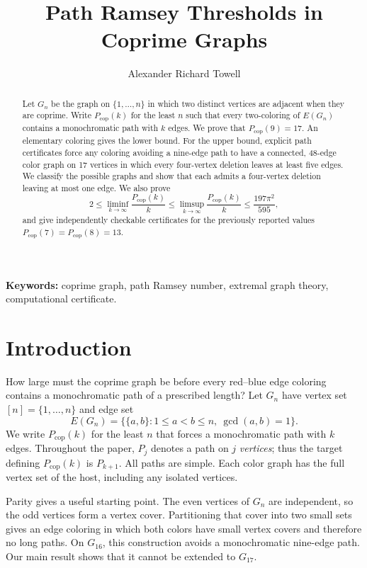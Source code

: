 \documentclass[12pt]{article}
\title{Path Ramsey Thresholds in Coprime Graphs}
\author{Alexander Richard Towell\authornote{1}}
\newcommand{\Pcop}{P_{\mathrm{cop}}}
\begin{document}
\maketitle

\begin{abstract}
Let $G_n$ be the graph on $\{1,\ldots,n\}$ in which two distinct
vertices are adjacent when they are coprime. Write $\Pcop(k)$ for
the least $n$ such that every two-coloring of $E(G_n)$ contains a
monochromatic path with $k$ edges. We prove that $\Pcop(9)=17$.
An elementary coloring gives the lower bound. For the upper bound,
explicit path certificates force any coloring avoiding a nine-edge
path to have a connected, 48-edge color graph on 17 vertices in
which every four-vertex deletion leaves at least five edges.
We classify the possible graphs and show that each admits a
four-vertex deletion leaving at most one edge. We also prove
\[
 2\leq\liminf_{k\to\infty}\frac{\Pcop(k)}k
 \leq\limsup_{k\to\infty}\frac{\Pcop(k)}k
 \leq\frac{197\pi^2}{595},
\]
and give independently checkable certificates for the previously
reported values $\Pcop(7)=\Pcop(8)=13$.
\end{abstract}

\smallskip\noindent\textbf{Keywords:} coprime graph, path Ramsey number,
extremal graph theory, computational certificate.

\section{Introduction}

How large must the coprime graph be before every red--blue edge
coloring contains a monochromatic path of a prescribed length?
Let $G_n$ have vertex set $[n]=\{1,\ldots,n\}$ and edge set
\[
 E(G_n)=\bigl\{\{a,b\}:1\leq a<b\leq n,\ \gcd(a,b)=1\bigr\}.
\]
We write $\Pcop(k)$ for the least $n$ that forces a monochromatic
path with $k$ edges. Throughout the paper, $P_j$ denotes a path
on $j$ \emph{vertices}; thus the target defining $\Pcop(k)$ is
$P_{k+1}$. All paths are simple. Each color graph has the full
vertex set of the host, including any isolated vertices.

Parity gives a useful starting point. The even vertices of $G_n$
are independent, so the odd vertices form a vertex cover.
Partitioning that cover into two small sets gives an edge coloring
in which both colors have small vertex covers and therefore no
long paths. On $G_{16}$, this construction avoids a monochromatic
nine-edge path. Our main result shows that it cannot be extended
to $G_{17}$.
\end{document}
